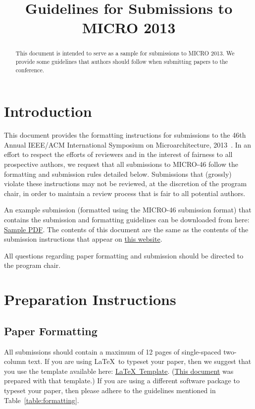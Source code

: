 \documentclass[pageno]{jpaper}
\begin{document}
\title{Guidelines for Submissions to MICRO 2013}

\date{}
\maketitle

\thispagestyle{empty}

\begin{abstract}
This document is intended to serve as a sample for submissions to MICRO 2013.
We provide some guidelines that authors should follow when submitting papers to
the conference.
\end{abstract}

\section{Introduction}

This document provides the formatting instructions for submissions to the 46th
Annual IEEE/ACM International Symposium on Microarchitecture,
2013~\cite{micro46}. In an effort to respect the efforts of reviewers and in
the interest of fairness to all prospective authors, we request that all
submissions to MICRO-46 follow the formatting and submission rules detailed
below.  Submissions that (grossly) violate these instructions may not be
reviewed, at the discretion of the program chair, in order to maintain a review
process that is fair to all potential authors.

An example submission (formatted using the MICRO-46 submission format) that
contains the submission and formatting guidelines can be downloaded from here:
\href{http://www.microarch.org/micro46/files/micro46-template.pdf}{Sample
PDF}. The contents of this document are the same as the contents of the
submission instructions that appear on
\href{http://www.microarch.org/micro46/submission.html}{this website}.

All questions regarding paper formatting and submission should be directed to
the program chair.

\section{Preparation Instructions}

\subsection{Paper Formatting} 

All submissions should contain a maximum of 12 pages of single-spaced
two-column text. If you are using \LaTeX~to typeset your paper, then we suggest
that you use the template available here:
\href{http://www.microarch.org/micro46/files/micro46-latex-template.tar.gz}{\LaTeX~Template}.
(\href{http://www.microarch.org/micro46/files/micro46-template.pdf}{This
document} was prepared with that template.)  If you are using a different
software package to typeset your paper, then please adhere to the guidelines
mentioned in Table~\ref{table:formatting}.
\end{document}

